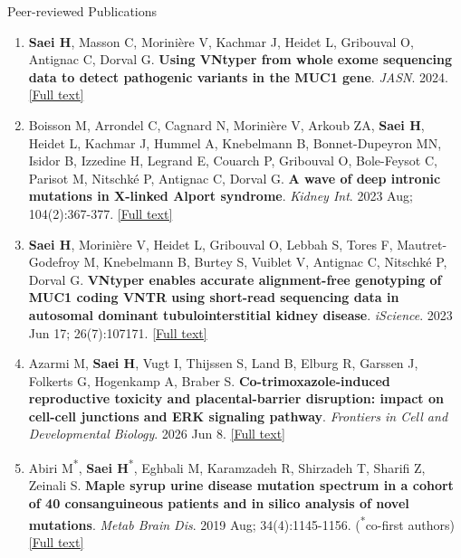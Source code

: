 \documentclass[
	11pt, %
]{resume} %
\begin{document}
\begin{rSection}{Peer-reviewed Publications}
\begin{enumerate}
  \item \textbf{Saei H}, Masson C, Morinière V, Kachmar J, Heidet L, Gribouval O, Antignac C, Dorval G. 
   \textbf{Using VNtyper from whole exome sequencing data to detect pathogenic variants in the MUC1 gene}. 
  \textit{JASN}. 2024. \href{https://journals.lww.com/jasn/fulltext/2025/02000/using_vntyper_from_whole_exome_sequencing_data_to.25.aspx}{[Full text]}

  \item Boisson M, Arrondel C, Cagnard N, Morinière V, Arkoub ZA, \textbf{Saei H}, Heidet L, Kachmar J, Hummel A,
  Knebelmann B, Bonnet-Dupeyron MN, Isidor B, Izzedine H, Legrand E, Couarch P, Gribouval O, Bole-Feysot
  C, Parisot M, Nitschké P, Antignac C, Dorval G.  \textbf{A wave of deep intronic mutations in X-linked Alport syndrome}.
  \textit{Kidney Int}. 2023 Aug; 104(2):367-377. \href{https://www.kidney-international.org/article/S0085-2538(23)00376-9/fulltext}{[Full text]}

  \item \textbf{Saei H}, Morinière V, Heidet L, Gribouval O, Lebbah S, Tores F, Mautret-Godefroy M, Knebelmann B, Burtey
  S, Vuiblet V, Antignac C, Nitschké P, Dorval G.  \textbf{VNtyper enables accurate alignment-free genotyping
  of MUC1 coding VNTR using short-read sequencing data in autosomal dominant tubulointerstitial kidney
  disease}. \textit{iScience}. 2023 Jun 17; 26(7):107171. \href{https://www.cell.com/action/showPdf?pii=S2589-0042%2823%2901248-8}{[Full text]}
  
    \item Azarmi M, \textbf{Saei H}, Vugt I, Thijssen S, Land B, Elburg R, Garssen J, Folkerts G, Hogenkamp A, Braber S.  \textbf{Co-trimoxazole-induced reproductive toxicity and placental-barrier disruption: impact on cell-cell junctions and ERK signaling pathway}. \textit{Frontiers in Cell and Developmental Biology}. 2026 Jun 8. \href{https://www.frontiersin.org/journals/cell-and-developmental-biology/articles/10.3389/fcell.2026.1800328/full}{[Full text]}

  \item Abiri M\textsuperscript{*}, \textbf{Saei H}\textsuperscript{*}, Eghbali M, Karamzadeh R, Shirzadeh T, Sharifi Z, Zeinali S. 
   \textbf{Maple syrup urine disease mutation spectrum in a cohort of 40 consanguineous patients and in silico analysis of novel mutations}. 
  \textit{Metab Brain Dis}. 2019 Aug; 34(4):1145-1156. (\textsuperscript{*}co-first authors) \href{https://link.springer.com/article/10.1007/s11011-019-00435-y}{[Full text]}


\end{enumerate}
\end{rSection}
\end{document}
